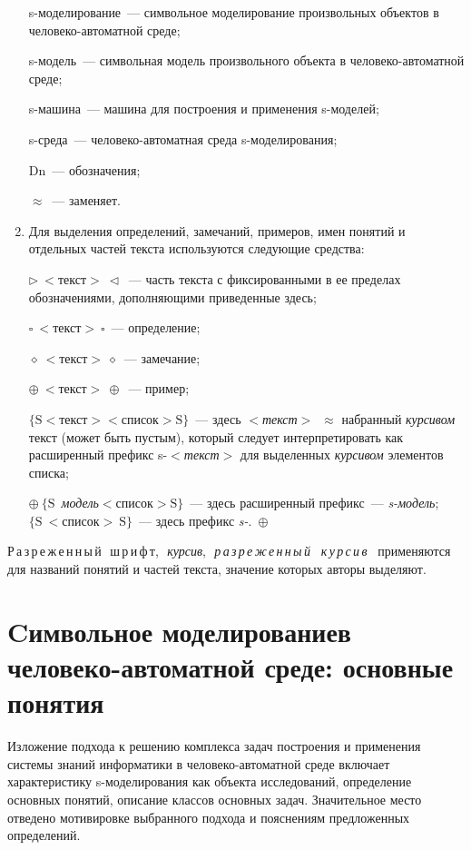 \begin{multicols}{2}
\begin{enumerate}[1.]
s-моделирование~--- символьное моделирование произвольных объектов
в человеко-автоматной среде;

s-модель~--- символьная модель произвольного объекта в
человеко-автоматной среде;

s-машина~--- машина для построения и применения s-моделей;

s-среда~--- человеко-автоматная среда s-мо\-де\-ли\-ро\-ва\-ния;

Dn~--- обозначения;

$\approx$~--- заменяет.
\item Для выделения определений, замечаний, примеров, имен понятий и
отдельных частей текста используются следующие средства:

$\triangleright~<$текст$>~\triangleleft$~--- часть текста с фиксированными в ее
пределах обозначениями, до\-пол\-ня\-ющи\-ми приведенные здесь;

$\square\ <$текст$>~\square$~--- определение;

$\diamond~<$текст$>~\diamond$~--- замечание;

$\oplus~<$текст$>~\oplus$~--- пример;

$\{\mbox{S} <$$\textit{текст}$$>$$<$$\mbox{список}$$>\mbox{S}\}$~--- здесь
$<$\textit{текст}$>$~$\approx$ набранный \textit{курсивом} текст (может быть
пус\-тым), который следует интерпретировать как расширенный префикс
s-$<$\textit{текст}$>$ для выделенных \textit{курсивом} элементов списка;

$\oplus\ \{\mbox{S}$~\textit{модель}$<\mbox{список}>\mbox{S}\}$~--- здесь
расширенный префикс~--- \textit{s-модель}; $\{\mbox{S}\ <\mbox{список}>\
\mbox{S}\}$~--- здесь префикс \textit{s-}.~$\oplus$
\end{enumerate}

Р\,а\,з\,р\,е\,ж\,е\,н\,н\,ы\,й\,\ ш\,р\,и\,ф\,т,\,\ \textit{курсив},\,\
\textit{р\,а\,з\,\-р\,е\,\-ж\,е\,н\,\-н\,ы\,й\,\,\ к\,у\,р\,с\,и\,в\,}\,\ 
применяются для названий понятий и частей текста, значение которых авторы 
вы\-де\-ляют. 

\section{Cимвольное моделирование\newline в человеко-автоматной среде:
основные понятия} %

Изложение подхода к решению комплекса задач построения и применения
системы знаний информатики в человеко-автоматной среде включает
характеристику s-моделирования как объекта исследований, определение
основных понятий, описание классов основных задач. Значительное место
отведено мотивировке выбранного подхода и пояснениям предложенных
определений.


\end{multicols}
